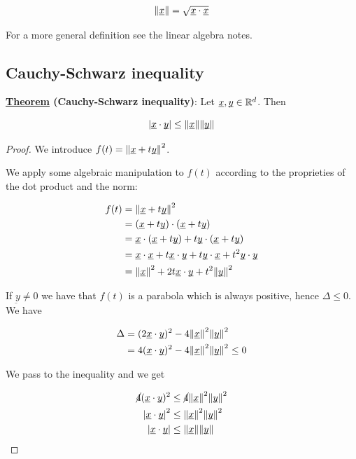 \documentclass[10pt]{extarticle}
\renewcommand{\vec}[1]{\underbar{\ensuremath{#1}}}
\begin{document}
$$
    \norm{\vec{x}} = \sqrt{\vec{x} \cdot \vec{x}}
$$

For a more general definition see the linear algebra notes.

\subsection{Cauchy-Schwarz inequality}

\textbf{\underline{Theorem} (Cauchy-Schwarz inequality)}: Let $\vec{x}, \vec{y} \in \R^d$. Then

$$
    \abs{\vec{x} \cdot \vec{y}} \leq \norm{\vec{x}} \norm{\vec{y}}
$$

\begin{proof}
    We introduce $f(t) = \norm{\vec{x} + t \vec{y}}^2$.

    We apply some algebraic manipulation to $f(t)$ according to the proprieties of the dot product and the norm:

    \begin{align*}
        f(t) & = \norm{\vec{x} + t \vec{y}}^2                                                                                                              \\
             & = (\vec{x} + t \vec{y}) \cdot (\vec{x} + t \vec{y})                                                                             \\
             & = \vec{x} \cdot (\vec{x} + t \vec{y}) + t \vec{y} \cdot (\vec{x} + t \vec{y})                                       \\
             & = \vec{x} \cdot \vec{x} + t \vec{x} \cdot \vec{y} + t \vec{y} \cdot \vec{x} + t^2 \vec{y} \cdot \vec{y} \\
             & = \norm{\vec{x}}^2 + 2t \vec{x} \cdot \vec{y} + t^2 \norm{\vec{y}}^2
    \end{align*}

    If $\vec{y} \ne 0$ we have that $f(t)$ is a parabola which is always positive, hence $\Delta \leq 0$. We have

    \begin{align*}
        \Delta & = (2 \vec{x} \cdot \vec{y})^2 - 4 \norm{\vec{x}}^2 \norm{\vec{y}}^2        \\
               & = 4 (\vec{x} \cdot \vec{y})^2 - 4 \norm{\vec{x}}^2 \norm{\vec{y}}^2 \leq 0 \\
    \end{align*}

    We pass to the inequality and we get

    \begin{align*}
        \cancel{4}(\vec{x} \cdot \vec{y})^2 & \leq \cancel{4} \norm{\vec{x}}^2 \norm{\vec{y}}^2 \\
        \abs{\vec{x} \cdot \vec{y}} ^2      & \leq \norm{\vec{x}}^2 \norm{\vec{y}}^2            \\
        \abs{\vec{x} \cdot \vec{y}}         & \leq \norm{\vec{x}} \norm{\vec{y}}
    \end{align*}
\end{proof}
\end{document}

